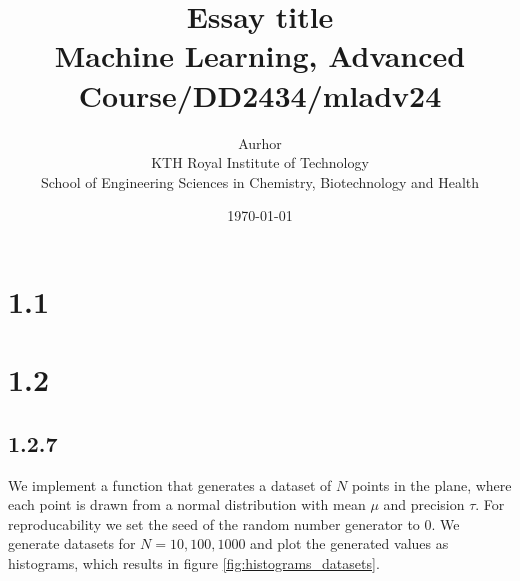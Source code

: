 \documentclass{article}
\title{Essay title\\\Large{Machine Learning, Advanced Course/DD2434/mladv24}}
\author{Aurhor \\ KTH Royal Institute of Technology\\ School of Engineering Sciences in Chemistry, Biotechnology and Health}
\date{\today}
\begin{document}
\maketitle
\thispagestyle{fancy}
\clearpage
\tableofcontents
\thispagestyle{fancy}

\clearpage
\fancyfoot[C]{\thepage}
\begin{multicols}{2}

    \section*{1.1}

    \section*{1.2}

    \subsection*{1.2.7}
    We implement a function that generates a dataset of $N$ points in the plane, where each point is drawn from a normal distribution with mean $\mu$ and precision $\tau$. For reproducability we set the seed of the random number generator to 0. We generate datasets for $N = 10, 100, 1000$ and plot the generated values as histograms, which results in figure \autoref{fig:histograms_datasets}. 


\end{multicols}
\end{document}
